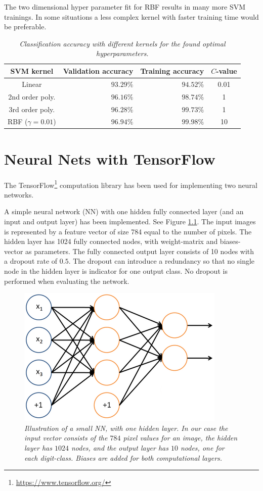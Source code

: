 \documentclass[a4paper,10pt,article,oneside,english]{memoir}
\let\oldcaption\caption
\renewcommand{\caption}[1]{\oldcaption{\emph{#1}}}
\begin{document}
	The two dimensional hyper parameter fit for RBF results in many more SVM trainings. In some situations a less complex kernel with faster training time would be preferable.
	
	\begin{table}[h!]
		\centering
		\caption{Classification accuracy with different kernels for the found optimal hyperparameters. }
		\label{tab:svm_accuracy}
		\begin{tabular}{crr S[table-format=2.4]}
			SVM kernel & Validation accuracy & Training accuracy & {$C$-value} \\ 
			\hline 
			Linear & $93.29\%$ & $94.52\%$ & 0.01 \\ 
			2nd order poly. & $96.16\%$ & $98.74\%$ & 1 \\ 
			3rd order poly. & $96.28\%$ & $99.73\%$ & 1 \\ 
			RBF ($\gamma=0.01$) & $96.94\%$ & $99.98\%$ & 10 \\ 
		\end{tabular} 
	\end{table}
	
	
	
	
	
	
	
	
	
	
	\chapter{Neural Nets with TensorFlow}
	The TensorFlow\footnote{\url{https://www.tensorflow.org/}} computation library has been used for implementing two neural networks. 
	
	A simple neural network (NN) with one hidden fully connected layer (and an input and output layer) has been implemented. See Figure \ref{fig:nn_layout}. The input images is represented by a feature vector of size 784 equal to the number of pixels. The hidden layer has 1024 fully connected nodes, with weight-matrix and biases-vector as parameters. The fully connected output layer consists of 10 nodes with a dropout rate of $0.5$. The dropout can introduce a redundancy so that no single node in the hidden layer is indicator for one output class. No dropout is performed when evaluating the network.
	
	\begin{figure}[h!]
		\centering
		\includegraphics[width=0.4\linewidth]{nn_layout.png}
		\caption{Illustration of a small NN, with one hidden layer. In our case the input vector consists of the $784$ pixel values for an image, the hidden layer has $1024$ nodes, and the output layer has $10$ nodes, one for each digit-class. Biases are added for both computational layers.}
		\label{fig:nn_layout}
	\end{figure}
	
\end{document}
